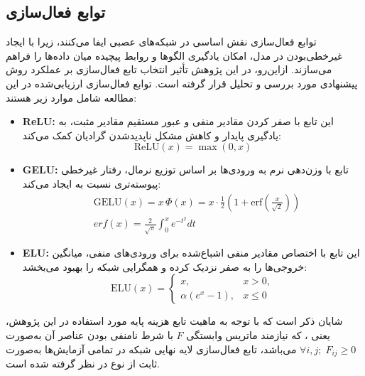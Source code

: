 \subsection{توابع فعال‌سازی}
توابع فعال‌سازی نقش اساسی در شبکه‌های عصبی ایفا می‌کنند، زیرا با ایجاد غیرخطی‌بودن در مدل، امکان یادگیری الگوها و روابط پیچیده میان داده‌ها را فراهم می‌سازند. ازاین‌رو، در این پژوهش تأثیر انتخاب تابع فعال‌سازی بر عملکرد روش پیشنهادی مورد بررسی و تحلیل قرار گرفته است. توابع فعال‌سازی ارزیابی‌شده در این مطالعه شامل موارد زیر هستند:
\begin{itemize}
	\item \textbf{ReLU:}  
	این تابع با صفر کردن مقادیر منفی و عبور مستقیم مقادیر مثبت، به یادگیری پایدار و کاهش مشکل ناپدیدشدن گرادیان کمک می‌کند:
	\begin{equation}
		\mathrm{ReLU}(x) = \max(0, x)
	\end{equation}
	
	\item \textbf{GELU:}  
	تابع  با وزن‌دهی نرم به ورودی‌ها بر اساس توزیع نرمال، رفتار غیرخطی پیوسته‌تری نسبت به  ایجاد می‌کند:
	\begin{equation}
		\begin{aligned}
			& \mathrm{GELU}(x) = x \, \Phi(x) 
			= x \cdot \frac{1}{2} \left(1 + \mathrm{erf}\!\left(\frac{x}{\sqrt{2}}\right)\right) \\
			& erf(x) = \frac{2}{\sqrt{\pi}}\int_0^x e^{-t^2}dt
		\end{aligned}
	\end{equation}
	
	\item \textbf{ELU:}  
	این تابع با اختصاص مقادیر منفی اشباع‌شده برای ورودی‌های منفی، میانگین خروجی‌ها را به صفر نزدیک کرده و همگرایی شبکه را بهبود می‌بخشد:
	\begin{equation}
		\mathrm{ELU}(x) =
		\begin{cases}
			x, & x > 0, \\
			\alpha \left(e^{x} - 1\right), & x \le 0
		\end{cases}
	\end{equation}
\end{itemize}

شایان ذکر است که با توجه به ماهیت تابع هزینه پایه مورد استفاده در این پژوهش، یعنی ، که نیازمند ماتریس وابستگی $F$ با شرط نامنفی بودن عناصر آن به‌صورت
$\forall i,j;\;F_{ij} \ge 0$
می‌باشد، تابع فعال‌سازی لایه نهایی شبکه در تمامی آزمایش‌ها به‌صورت ثابت از نوع  در نظر گرفته شده است.


